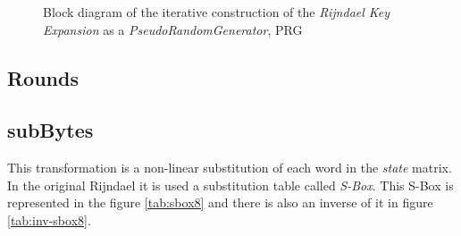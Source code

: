 \documentclass[10pt,a4paper,twoside]{llncs}
\begin{document}
\begin{figure}
\begin{center}
\begin{tikzpicture}[>=latex]
\end{tikzpicture}
\caption{Block diagram of the iterative construction of the \emph{Rijndael Key Expansion} as a \emph{PseudoRandomGenerator}, PRG}
\label{fig:keyExpansionDiagram}
\end{center}
\end{figure}

\subsection{Rounds}

\subsection{subBytes}
This transformation is a non-linear substitution of each word in the \emph{state} matrix. In the original Rijndael it is used a substitution table called \emph{S-Box}. This S-Box is represented in the figure \ref{tab:sbox8} and there is also an inverse of it in figure \ref{tab:inv-sbox8}.
\end{document}
